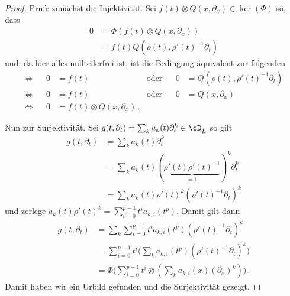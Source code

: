 \begin{proof}
Prüfe zunächst die Injektivität. Sei $f(t)\otimes Q(x,\partial_x)\in
\ker(\Phi)$ so, dass
\begin{align*}
0 &= \Phi(f(t)\otimes Q(x,\partial_x))
\\&= f(t)Q(\rho(t),\rho'(t)^{-1}\partial_t)
\end{align*}
und, da hier alles nullteilerfrei ist, ist die Bedingung äquivalent zur
folgenden
\begin{align*}
\Leftrightarrow && 0&=f(t) &\text{oder}&& 0&=Q(\rho(t),\rho'(t)^{-1}\partial_t)
\\\Leftrightarrow && 0&=f(t) &\text{oder}&& 0&=Q(x,\partial_x)
\\\Leftrightarrow&& 0&=f(t)\otimes Q(x,\partial_x) \,.
\end{align*}
\begin{comment} TODO: korrekt? \end{comment}
Nun zur Surjektivität.
Sei $g(t,\partial_t)=\sum_ka_k(t)\partial_t^k\in\cD_{\hat L}$ so gilt
\begin{align*}
g(t,\partial_t)&=\sum_ka_k(t)\partial_t^k
\\&=\sum_ka_k(t)(\underset{=1}{\underbrace{\rho'(t)\rho'(t)^{-1}}})^k
  \partial_t^k
\\&=\sum_ka_k(t)\rho'(t)^k(\rho'(t)^{-1} \partial_t)^k
\end{align*}
und zerlege $a_k(t)\rho'(t)^k=\sum_{i=0}^{p-1}t^ia_{k,i}(t^p)$. Damit gilt dann
\begin{align*}
g(t,\partial_t)&= \sum_k\sum_{i=0}^{p-1}t^ia_{k,i}(t^p)
  (\rho'(t)^{-1} \partial_t)^k
\\&= \sum_{i=0}^{p-1}t^i\Big(\sum_ka_{k,i}(t^p)
  (\rho'(t)^{-1} \partial_t)^k\Big)
\\&= \Phi\Big(\sum_{i=0}^{p-1}t^i\otimes(\sum_ka_{k,i}(x)
  (\partial_x)^k)\Big) \,.
\end{align*}
Damit haben wir ein Urbild gefunden und die Surjektivität gezeigt.
\end{proof}

